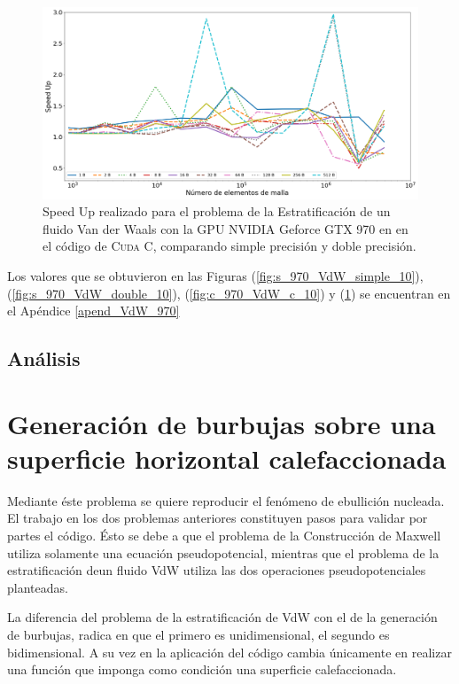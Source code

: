 \begin{figure}[htbp]
	\centering
	\includegraphics[width=\textwidth]{figs/cap4/c_970_VdW_cuda_10}
	\caption{Speed Up realizado para el problema de la Estratificación de un fluido Van der Waals con la GPU NVIDIA Geforce GTX 970 en en el código de \textsc{Cuda C}, comparando simple precisión y doble precisión.} 
	\label{fig:c_970_VdW_cuda_10}	
\end{figure}

Los valores que se obtuvieron en las Figuras (\ref{fig:s_970_VdW_simple_10}), (\ref{fig:s_970_VdW_double_10}), (\ref{fig:c_970_VdW_c_10}) y (\ref{fig:c_970_VdW_cuda_10}) se encuentran en el Apéndice \ref{apend_VdW_970}

\subsection{Análisis}



\newpage


\section{Generación de burbujas sobre una superficie horizontal calefaccionada}

Mediante éste problema se quiere reproducir el fenómeno de ebullición nucleada. El trabajo en los dos problemas anteriores constituyen pasos para validar por partes el código. Ésto se debe a que el problema de la Construcción de Maxwell utiliza solamente una ecuación pseudopotencial, mientras que el problema de la estratificación deun fluido VdW utiliza las dos operaciones pseudopotenciales planteadas.

La diferencia del problema de la estratificación de VdW con el de la generación de burbujas, radica en que el primero es unidimensional, el segundo es bidimensional. A su vez en la aplicación del código cambia únicamente en realizar una función que imponga como condición una superficie calefaccionada.

